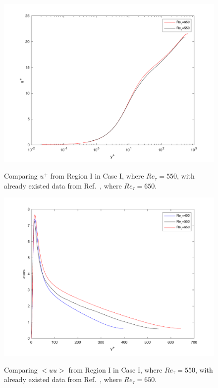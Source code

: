 \documentclass[twocolumn,10pt]{asme2e}
\begin{document}
\begin{figure}[t]
\centering
\scalebox{0.5}
{\includegraphics{comparing_u.pdf}}
\caption{Comparing \(u^+\) from Region I in Case I, where \(Re_{\tau}=550\), with already existed data from Ref.~\cite{iwamoto2002}, where \(Re_{\tau}=650\).}
\label{fig:comparing_u}
\end{figure}

\begin{figure}[t]
\centering
\scalebox{0.5}
{\includegraphics{comparing_uu_400_650.pdf}}
\caption{Comparing \(<uu>\) from Region I in Case I, where \(Re_{\tau}=550\), with already existed data from Ref.~\cite{iwamoto2002}, where \(Re_{\tau}=650\).}
\label{fig:comparing_uu}
\end{figure}
\end{document}
